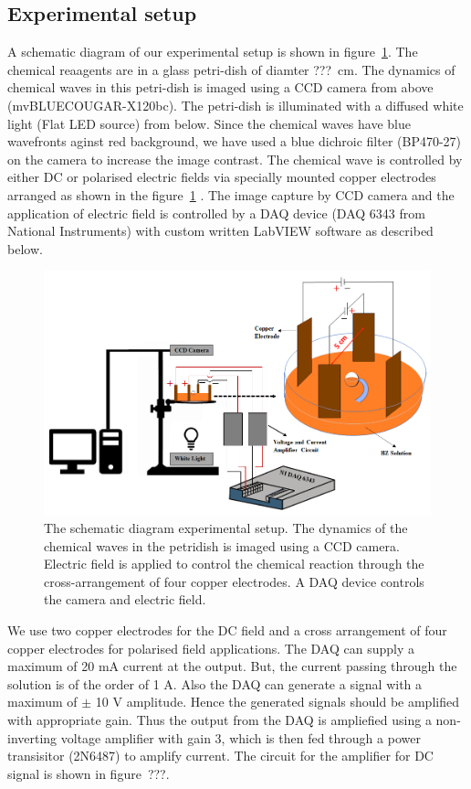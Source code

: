 \documentclass[journal=jacsat,manuscript=article]{achemso}
\begin{document}
\subsection{Experimental setup}
A schematic diagram of our experimental setup is shown in figure~\ref{fig:ex1}.
The chemical reaagents are in a glass petri-dish of diamter ???~cm.
The dynamics of chemical waves in this petri-dish is imaged using a CCD camera from above (mvBLUECOUGAR-X120bc). 
The petri-dish is illuminated with a diffused white light (Flat LED source) from below. Since the chemical waves have blue wavefronts aginst red background, we have used a  blue dichroic filter
(BP470-27) on the camera to increase the image contrast.
The chemical wave is controlled by either DC or polarised electric fields via specially mounted copper electrodes arranged as shown in the figure~\ref{fig:ex1} .
The image capture by CCD camera and the application of electric field is controlled by a DAQ device (DAQ 6343 from National Instruments) with custom written LabVIEW software as described below.
\begin{figure}[H]
    \centering
    \includegraphics[width=\linewidth]{experiment_setup_01.png}
    \caption{The schematic diagram experimental setup.
      The dynamics of the chemical waves in the petridish is imaged using a CCD camera.
      Electric field is applied to control the chemical reaction through the cross-arrangement
      of four copper electrodes.
      A DAQ device controls the camera and electric field.}
    \label{fig:ex1}
\end{figure}

  We use two copper electrodes for the DC field and a
cross arrangement of four copper electrodes for polarised field
applications. The DAQ can supply a maximum of 20 mA current at the
output. But, the current passing through the solution is of the order of 1 A.
Also the DAQ can generate a signal
with a maximum of $\pm$ 10 V amplitude. Hence the generated signals
should be amplified with appropriate gain.
Thus the output from the  DAQ is ampliefied using a non-inverting
voltage amplifier with gain 3,
which is then fed through a power transisitor (2N6487) to amplify current.
The circuit for the amplifier for DC signal is shown in figure~{???}.
\end{document}
